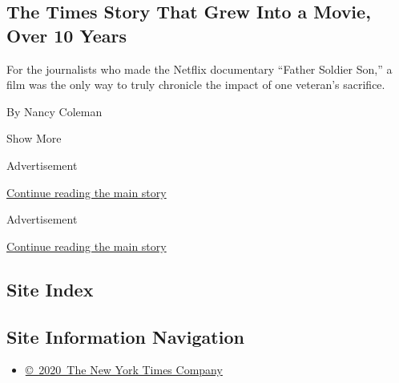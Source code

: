 \begin{enumerate}
  \hypertarget{the-times-story-that-grew-into-a-movie-over-10-years}{%
  \subsection{The Times Story That Grew Into a Movie, Over 10
  Years}\label{the-times-story-that-grew-into-a-movie-over-10-years}}

  For the journalists who made the Netflix documentary ``Father Soldier
  Son,'' a film was the only way to truly chronicle the impact of one
  veteran's sacrifice.

  By Nancy Coleman
\end{enumerate}

Show More

Advertisement

\protect\hyperlink{after-mid4}{Continue reading the main story}

Advertisement

\protect\hyperlink{after-mktg}{Continue reading the main story}

\hypertarget{site-index}{%
\subsection{Site Index}\label{site-index}}

\hypertarget{site-information-navigation}{%
\subsection{Site Information
Navigation}\label{site-information-navigation}}

\begin{itemize}
\tightlist
\item
  \href{https://help.nytimes.com/hc/en-us/articles/115014792127-Copyright-notice}{©~2020~The
  New York Times Company}
\end{itemize}

